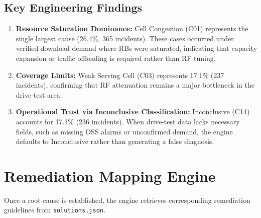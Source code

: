 \subsection{Key Engineering Findings}

\begin{enumerate}
\item \textbf{Resource Saturation Dominance:} Cell Congestion (C01) represents the single largest cause (26.4\%, 365 incidents). These cases occurred under verified download demand where RBs were saturated, indicating that capacity expansion or traffic offloading is required rather than RF tuning.

\item \textbf{Coverage Limits:} Weak Serving Cell (C03) represents 17.1\% (237 incidents), confirming that RF attenuation remains a major bottleneck in the drive-test area.

\item \textbf{Operational Trust via Inconclusive Classification:} Inconclusive (C14) accounts for 17.1\% (236 incidents). When drive-test data lacks necessary fields, such as missing OSS alarms or unconfirmed demand, the engine defaults to Inconclusive rather than generating a false diagnosis.
\end{enumerate}

\FloatBarrier

\section{Remediation Mapping Engine}

Once a root cause is established, the engine retrieves corresponding remediation guidelines from \texttt{solutions.json}.

